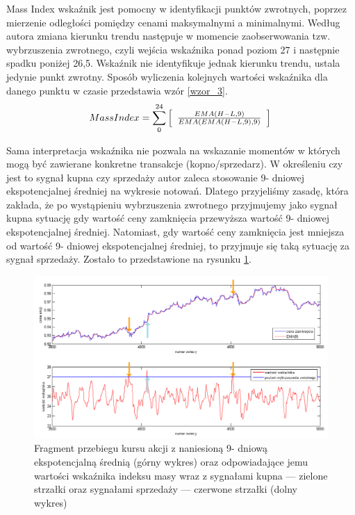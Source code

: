 \documentclass[12pt,a4paper]{article}
\begin{document}
Mass Index wskaźnik jest pomocny w identyfikacji punktów zwrotnych, poprzez mierzenie odległości pomiędzy cenami maksymalnymi a minimalnymi. Według autora zmiana kierunku trendu następuje w momencie zaobserwowania tzw. wybrzuszenia zwrotnego, czyli wejścia wskaźnika ponad poziom 27 i następnie spadku poniżej 26,5. Wskaźnik nie identyfikuje jednak kierunku trendu, ustala jedynie punkt zwrotny. Sposób wyliczenia kolejnych wartości wskaźnika dla danego punktu w czasie przedstawia wzór \ref{wzor_3}.
\begin{equation}
Mass Index = \sum_{0}^{24} \left[\begin{array}{c} \frac{ EMA(H - L, 9)}{ EMA(EMA(H-L, 9), 9)}\end{array}\right]\\
\label{wzor_3}
\end{equation}

\noindent Sama interpretacja wskaźnika nie pozwala na wskazanie momentów w których mogą być zawierane konkretne transakcje (kopno/sprzedarz). W określeniu czy jest to sygnał kupna czy sprzedaży autor zaleca stosowanie 9- dniowej ekspotencjalnej średniej na wykresie notowań. Dlatego przyjeliśmy zasadę, która zakłada, że po wystąpieniu wybrzuszenia zwrotnego przyjmujemy jako sygnał kupna sytuację gdy wartość ceny zamknięcia przewyższa wartość 9- dniowej ekspotencjalnej średniej. Natomiast, gdy wartość ceny zamknięcia jest mniejsza od wartość 9- dniowej ekspotencjalnej średniej, to przyjmuje się taką sytuację za sygnał sprzedaży. Zostało to przedstawione na rysunku \ref{kupsprz2}. \\
\begin{figure}[h!]
\centering
\includegraphics[width = \textwidth]{mi2.png}
\caption{Fragment przebiegu kursu akcji z naniesioną  9- dniową ekspotencjalną średnią (górny wykres) oraz odpowiadające jemu wartości wskaźnika indeksu masy wraz z sygnałami kupna --- zielone strzałki oraz sygnałami sprzedaży --- czerwone strzałki (dolny wykres)}
\label{kupsprz2}
\end{figure}
\FloatBarrier
\end{document}
